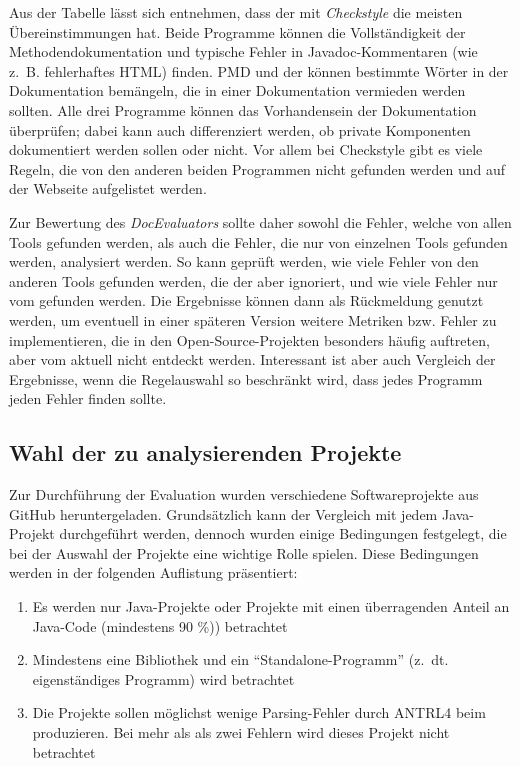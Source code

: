 Aus der Tabelle lässt sich entnehmen, dass der \doceval mit \textit{Checkstyle} die meisten Übereinstimmungen hat. Beide Programme können die Vollständigkeit der Methodendokumentation und typische Fehler in Javadoc-Kommentaren (wie z.~B. fehlerhaftes HTML) finden. PMD und der \doceval können bestimmte Wörter in der Dokumentation bemängeln, die in einer Dokumentation vermieden werden sollten. Alle drei Programme können das Vorhandensein der Dokumentation überprüfen; dabei kann auch differenziert werden, ob private Komponenten dokumentiert werden sollen oder nicht. Vor allem bei Checkstyle gibt es viele Regeln, die von den anderen beiden Programmen nicht gefunden werden und auf der Webseite \cite{checkstyle_doc_metrics} aufgelistet werden.

Zur Bewertung des \textit{DocEvaluators} sollte daher sowohl die Fehler, welche von allen Tools gefunden werden, als auch die Fehler, die nur von einzelnen Tools gefunden werden, analysiert werden. So kann  geprüft werden, wie viele Fehler von den anderen Tools gefunden werden, die der \doceval aber ignoriert, und wie viele Fehler nur vom \doceval gefunden werden. Die Ergebnisse können dann als Rückmeldung genutzt werden, um  eventuell in einer späteren Version weitere Metriken bzw. Fehler zu implementieren, die in den Open-Source-Projekten besonders häufig auftreten, aber vom \doceval aktuell nicht entdeckt werden. Interessant ist aber auch Vergleich der Ergebnisse, wenn die Regelauswahl so beschränkt wird, dass jedes Programm jeden Fehler finden sollte.

\subsection{Wahl der zu analysierenden Projekte}
Zur Durchführung der Evaluation wurden verschiedene Softwareprojekte aus GitHub heruntergeladen. Grundsätzlich kann der Vergleich mit jedem Java-Projekt durchgeführt werden, dennoch wurden einige Bedingungen festgelegt, die bei der Auswahl der Projekte eine wichtige Rolle spielen. Diese Bedingungen werden in der folgenden Auflistung präsentiert:

\begin{enumerate}
    \item Es werden nur Java-Projekte oder Projekte mit einen überragenden Anteil an Java-Code (mindestens 90 \%)) betrachtet
    \item Mindestens eine Bibliothek und ein \enquote{Standalone-Programm} (z.~dt. eigenständiges Programm) wird betrachtet
    \item  Die Projekte sollen möglichst wenige Parsing-Fehler durch ANTRL4 beim \doceval produzieren. Bei mehr als als zwei Fehlern wird dieses Projekt nicht betrachtet
    
\end{enumerate}

